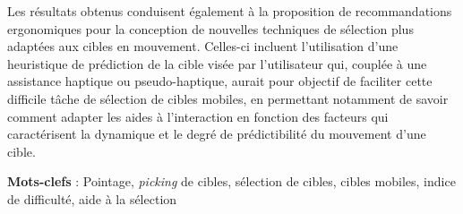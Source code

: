 	Les résultats obtenus conduisent également à la proposition de recommandations ergonomiques pour la conception de nouvelles techniques de sélection plus adaptées aux cibles en mouvement. Celles-ci incluent l'utilisation d'une heuristique de prédiction de la cible visée par l’utilisateur qui, couplée à une assistance haptique ou pseudo-haptique, aurait pour objectif de faciliter cette difficile tâche de sélection de cibles mobiles, en permettant notamment de savoir comment adapter les aides à l'interaction en fonction des facteurs qui caractérisent la dynamique et le degré de prédictibilité du mouvement d'une cible.
 


\textbf{Mots-clefs} : Pointage, \emph{picking} de cibles, sélection de cibles, cibles mobiles, indice de difficulté, aide à la sélection